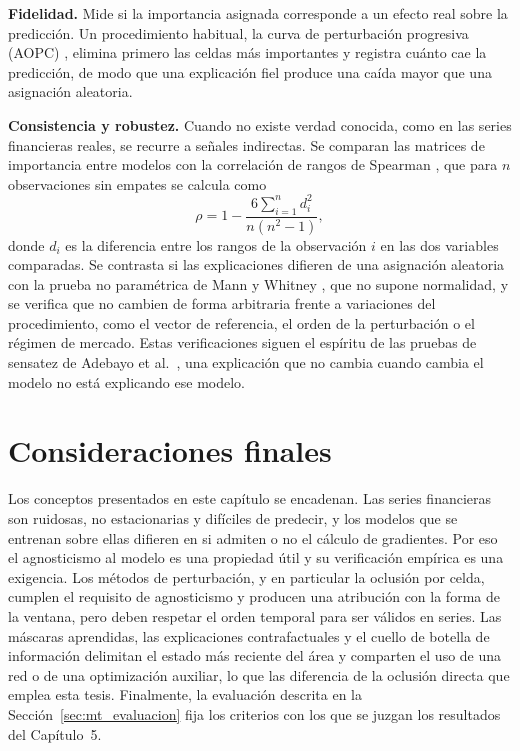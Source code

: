 \textbf{Fidelidad.} Mide si la importancia asignada corresponde a un efecto real sobre la predicción. Un procedimiento habitual, la curva de perturbación progresiva (AOPC) \cite{samek2017aopc}, elimina primero las celdas más importantes y registra cuánto cae la predicción, de modo que una explicación fiel produce una caída mayor que una asignación aleatoria.

\textbf{Consistencia y robustez.} Cuando no existe verdad conocida, como en las series financieras reales, se recurre a señales indirectas. Se comparan las matrices de importancia entre modelos con la correlación de rangos de Spearman \cite{spearman1904}, que para $n$ observaciones sin empates se calcula como
\begin{equation}
    \rho = 1 - \frac{6 \sum_{i=1}^{n} d_i^2}{n (n^2 - 1)},
\end{equation}
donde $d_i$ es la diferencia entre los rangos de la observación $i$ en las dos variables comparadas. Se contrasta si las explicaciones difieren de una asignación aleatoria con la prueba no paramétrica de Mann y Whitney \cite{mann1947}, que no supone normalidad, y se verifica que no cambien de forma arbitraria frente a variaciones del procedimiento, como el vector de referencia, el orden de la perturbación o el régimen de mercado. Estas verificaciones siguen el espíritu de las pruebas de sensatez de Adebayo et al.\ \cite{adebayo2018}, una explicación que no cambia cuando cambia el modelo no está explicando ese modelo.

\section{Consideraciones finales}

Los conceptos presentados en este capítulo se encadenan. Las series financieras son ruidosas, no estacionarias y difíciles de predecir, y los modelos que se entrenan sobre ellas difieren en si admiten o no el cálculo de gradientes. Por eso el agnosticismo al modelo es una propiedad útil y su verificación empírica es una exigencia. Los métodos de perturbación, y en particular la oclusión por celda, cumplen el requisito de agnosticismo y producen una atribución con la forma de la ventana, pero deben respetar el orden temporal para ser válidos en series. Las máscaras aprendidas, las explicaciones contrafactuales y el cuello de botella de información delimitan el estado más reciente del área y comparten el uso de una red o de una optimización auxiliar, lo que las diferencia de la oclusión directa que emplea esta tesis. Finalmente, la evaluación descrita en la Sección~\ref{sec:mt_evaluacion} fija los criterios con los que se juzgan los resultados del Capítulo~5.
